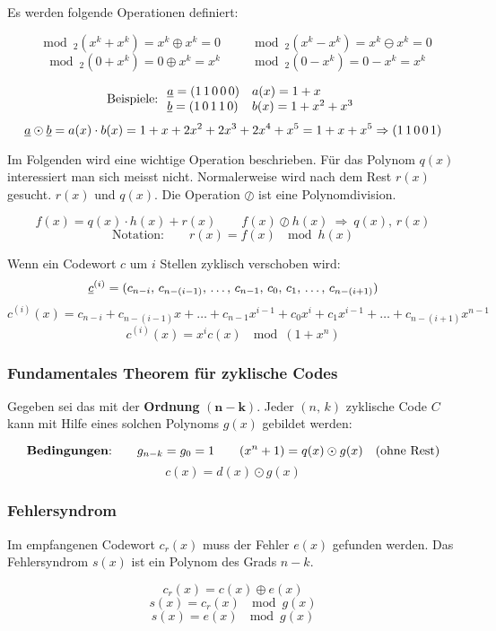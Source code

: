 \documentclass[a4paper]{article}
\begin{document}
\begin{twocolumn}
Es werden folgende Operationen definiert:

$$\mod_2(x^k + x^k) = x^k \oplus x^k = 0 \qquad \mod_2 (x^k - x^k) = x^k \ominus x^k = 0$$
$$\mod_2(0+x^k) = 0 \oplus x^k = x^k \qquad \mod_2(0-x^k) = 0 - x^k = x^k$$

$$\text{Beispiele:} \: 
\begin{array}{ll}
  \underline{a} = (1\,1\,0\,0\,0) & a(x) = 1 + x \\
  \underline{b} = (1\,0\,1\,1\,0) & b(x) = 1 + x^2 + x^3 \\
\end{array}$$
$$\underline{a} \odot \underline{b} = a(x) \cdot b(x) = 1 + x + 2x^2 + 2x^3 + 2x^4 + x^5 = 1 + x + x^5 \Rightarrow (1\,1\,0\,0\,1)$$

Im Folgenden wird eine wichtige Operation beschrieben. 
Für das Polynom $q(x)$ interessiert man sich meisst nicht.
Normalerweise wird nach dem Rest $r(x)$ gesucht. $r(x)$ und $q(x)$.
Die Operation $\oslash$ ist eine Polynomdivision.

$$f(x) = q(x) \cdot h(x) + r(x) \qquad f(x) \oslash h(x) \: \Rightarrow \: q(x), \, r(x) $$
$$\text{Notation:} \qquad r(x) = f(x) \: \mod h(x) $$

Wenn ein Codewort $c$ um $i$ Stellen zyklisch verschoben wird: 
$$\underline{c}^{(i)} = (c_{n-i},\,c_{n-(i-1)},\,\ldots,\,c_{n-1},\,c_0,\,c_1,\,\ldots,\,c_{n-(i+1)})$$
$$c^{(i)}(x) = c_{n-i} + c_{n-(i-1)} x + \ldots + c_{n-1} x^{i-1} + c_0 x^i + c_1 x^{i-1} + \ldots + c_{n-(i+1)}x^{n-1}$$
$$c^{(i)}(x) = x^i c(x) \: \mod \left(1+x^n\right)$$

\subsubsection{Fundamentales Theorem für zyklische Codes}
Gegeben sei das  mit der \textbf{Ordnung} $\mathbf{(n-k)}$. 
Jeder $(n,\,k)$ zyklische Code $C$ kann mit Hilfe eines solchen Polynoms $g(x)$ gebildet werden:

$$\text{\textbf{Bedingungen}:} \qquad g_{n-k} = g_0 = 1 \qquad (x^n + 1) = q(x) \odot g(x) \quad \text{(ohne Rest)}$$
$$c(x) = d(x) \odot g(x)$$

\subsubsection{Fehlersyndrom}
Im empfangenen Codewort $c_r(x)$ muss der Fehler $e(x)$ gefunden werden. 
Das Fehlersyndrom $s(x)$ ist ein Polynom des Grads $n-k$.

$$c_r(x) = c(x) \oplus e(x)$$
$$s(x) = c_r(x) \: \mod g(x)$$
$$s(x) = e(x) \: \mod g(x)$$



\end{twocolumn}
\end{document}
